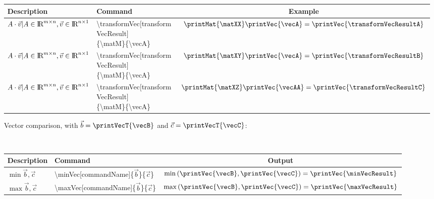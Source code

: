 \documentclass[10pt, a4paper]{article}
\begin{document}
\begin{center}
    \begin{tabular}{ l l c }
        Description & Command & Example\\ \hline
        \(A \cdot \vec{v} | A \in \textrm{I\!R}^{m\times n}, \vec{v} \in \textrm{I\!R}^{n\times 1}\) &
        \makecell[l]{\textbackslash transformVec[transformVecResult]\\\{\textbackslash matM\}\{\textbackslash vecA\}} &
        \(\printMat{\matXX}\printVec{\vecA} = \printVec{\transformVecResultA}\)\\
        \(A \cdot \vec{v} | A \in \textrm{I\!R}^{m\times n}, \vec{v} \in \textrm{I\!R}^{n\times 1}\) &
        \makecell[l]{\textbackslash transformVec[transformVecResult]\\\{\textbackslash matM\}\{\textbackslash vecA\}} &
        \(\printMat{\matXY}\printVec{\vecA} = \printVec{\transformVecResultB}\)\\
        \(A \cdot \vec{v} | A \in \textrm{I\!R}^{m\times n}, \vec{v} \in \textrm{I\!R}^{n\times 1}\) &
        \makecell[l]{\textbackslash transformVec[transformVecResult]\\\{\textbackslash matM\}\{\textbackslash vecA\}} &
        \(\printMat{\matXZ}\printVec{\vecAA} = \printVec{\transformVecResultC}\)\\
    \end{tabular}
\end{center}

Vector comparison, with \(\vec{b} = \printVecT{\vecB}\) and \(\vec{c} = \printVecT{\vecC}\):
\minVec{\vecB}{\vecC}
\maxVec{\vecB}{\vecC}

\getVecHeight{\vecB}
\vecHeightResult\\

\begin{center}
    \begin{tabular}{ l l c }
        Description & Command & Output\\ \hline
        \(\min{\vec{b}, \vec{c}}\) & \textbackslash minVec[commandName]\{\(\vec{b}\)\}\{\(\vec{c}\)\} & \(\min{\left(\printVec{\vecB}, \printVec{\vecC}\right)} = \printVec{\minVecResult}\)\\
        \(\max{\vec{b}, \vec{c}}\) & \textbackslash maxVec[commandName]\{\(\vec{b}\)\}\{\(\vec{c}\)\} & \(\max{\left(\printVec{\vecB}, \printVec{\vecC}\right)} = \printVec{\maxVecResult}\)\\
    \end{tabular}
\end{center}

\end{document}
